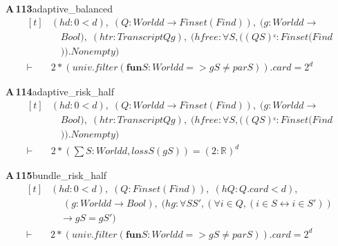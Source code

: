 \documentclass[conference]{IEEEtran}
\theoremstyle{definition}
\newcommand{\lean}[1]{\textsf{\footnotesize #1}}
\begin{document}
\noindent\textbf{A\,113}\quad\lean{adaptive\_balanced}
{\footnotesize\[ \begin{aligned}[t]
&(\mathit{hd} : 0 < \mathit{d}),\; (\mathit{Q} : \mathit{World} \mathit{d} \to \mathit{Finset} (\mathit{Fin} \mathit{d})),\; (\mathit{g} : \mathit{World} \mathit{d} \to\\
&\quad \mathit{Bool}),\; (\mathit{htr} : \mathit{Transcript} \mathit{Q} \mathit{g}),\; (\mathit{hfree} : \forall \mathit{S}, ((\mathit{Q} \mathit{S})ᶜ : \mathit{Finset} (\mathit{Fin} \mathit{d}\\
&\quad )).\mathit{Nonempty})\\
\vdash\;&2 * (\mathit{univ}.\mathit{filter} (\mathbf{fun} \mathit{S} : \mathit{World} \mathit{d} => \mathit{g} \mathit{S} \neq \mathit{par} \mathit{S})).\mathit{card} = 2 ^{\mathit{d}}
\end{aligned} \]}

\noindent\textbf{A\,114}\quad\lean{adaptive\_risk\_half}
{\footnotesize\[ \begin{aligned}[t]
&(\mathit{hd} : 0 < \mathit{d}),\; (\mathit{Q} : \mathit{World} \mathit{d} \to \mathit{Finset} (\mathit{Fin} \mathit{d})),\; (\mathit{g} : \mathit{World} \mathit{d} \to\\
&\quad \mathit{Bool}),\; (\mathit{htr} : \mathit{Transcript} \mathit{Q} \mathit{g}),\; (\mathit{hfree} : \forall \mathit{S}, ((\mathit{Q} \mathit{S})ᶜ : \mathit{Finset} (\mathit{Fin} \mathit{d}\\
&\quad )).\mathit{Nonempty})\\
\vdash\;&2 * (\textstyle\sum \mathit{S} : \mathit{World} \mathit{d}, \mathit{loss} \mathit{S} (\mathit{g} \mathit{S})) = (2 : \mathbb{R} ) ^{\mathit{d}}
\end{aligned} \]}

\noindent\textbf{A\,115}\quad\lean{bundle\_risk\_half}
{\footnotesize\[ \begin{aligned}[t]
&(\mathit{hd} : 0 < \mathit{d}),\; (\mathit{Q} : \mathit{Finset} (\mathit{Fin} \mathit{d})),\; (\mathit{hQ} : \mathit{Q}.\mathit{card} < \mathit{d}),\\
&\quad \; (\mathit{g} : \mathit{World} \mathit{d} \to \mathit{Bool}),\; (\mathit{hg} : \forall \mathit{S} \mathit{S'}, (\forall \mathit{i} \in \mathit{Q}, (\mathit{i} \in \mathit{S} \leftrightarrow \mathit{i} \in \mathit{S'}))\\
&\quad \to \mathit{g} \mathit{S} = \mathit{g} \mathit{S'})\\
\vdash\;&2 * (\mathit{univ}.\mathit{filter} (\mathbf{fun} \mathit{S} : \mathit{World} \mathit{d} => \mathit{g} \mathit{S} \neq \mathit{par} \mathit{S})).\mathit{card} = 2 ^{\mathit{d}}
\end{aligned} \]}
\end{document}
